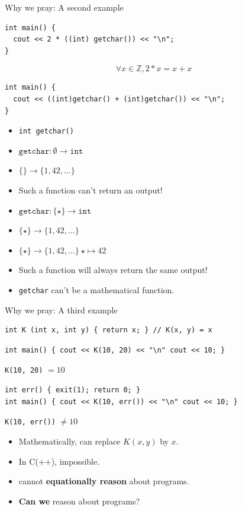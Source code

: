 \documentclass[8pt]{beamer}
\newcommand{\Z}{\mathbb Z}
\newcommand{\cpp}[1]{\texttt{#1}}
\begin{document}
\begin{frame}[fragile]{Why we pray: A second example}
\begin{verbatim}
int main() {
  cout << 2 * ((int) getchar()) << "\n";
}
\end{verbatim}
\pause

$$ \forall x \in \Z, 2 * x = x + x$$
\pause

\begin{verbatim}
int main() {
  cout << ((int)getchar() + (int)getchar()) << "\n";
}
\end{verbatim}

\pause


\begin{itemize}
    \item \cpp{int getchar()} \pause
    \item $\texttt{getchar}: \emptyset \rightarrow \texttt{int}$ \pause
    \item $\{ \} \rightarrow \{ 1, 42, \dots \}$ \pause
    \item Such a function can't return an output! \pause
    \item $\texttt{getchar}: \{ \star \} \rightarrow \texttt{int}$ \pause
    \item $\{ \star \} \rightarrow \{ 1, 42, \dots \}$ \pause
    \item $\{ \star \} \rightarrow \{ 1, 42, \dots \}~ \star \mapsto 42$ \pause
    \item Such a function will always return the same output! \pause
    \item \texttt{getchar} can't be a mathematical function.
\end{itemize}

\pause

\end{frame}

\begin{frame}[fragile]{Why we pray: A third example}
\begin{verbatim}
int K (int x, int y) { return x; } // K(x, y) = x
\end{verbatim}
\pause
\begin{verbatim}
int main() { cout << K(10, 20) << "\n" cout << 10; }
\end{verbatim}
\pause
\cpp{K(10, 20)} $=  10$
\pause
\begin{verbatim}
int err() { exit(1); return 0; }
int main() { cout << K(10, err()) << "\n" cout << 10; }
\end{verbatim}
\pause
\cpp{K(10, err())} $\neq 10$
\pause

\begin{itemize}
    \item Mathematically, can replace $K(x, y)$ by $x$. \pause
    \item In C(++), impossible. \pause
    \item cannot \textbf{equationally reason} about programs. \pause
    \item \textbf{Can we} reason about programs? \pause
\end{itemize}
\end{frame}
\end{document}
